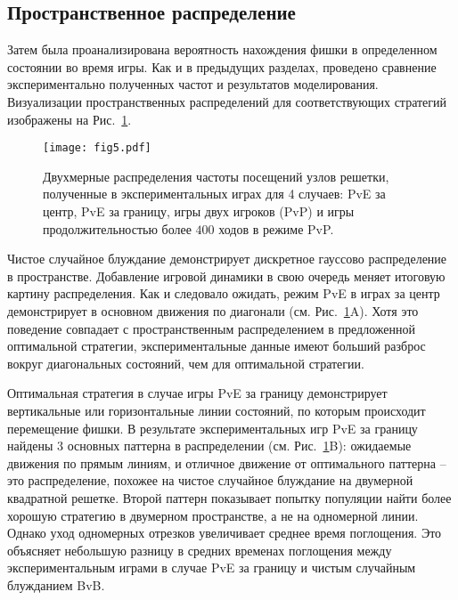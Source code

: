 \subsection{Пространственное распределение}\label{subsec:ch3/sec4/sub4}

Затем была проанализирована вероятность нахождения фишки в определенном состоянии во время игры. 
Как и в предыдущих разделах, проведено сравнение экспериментально полученных частот и результатов моделирования. 
Визуализации пространственных распределений для соответствующих стратегий изображены на Рис.~\cref{fig:distribution_states}.

\begin{figure}[t]
    \centering
    \texttt{[image: fig5.pdf]}
    \caption{
        Двухмерные распределения частоты посещений узлов решетки, полученные в экспериментальных играх для 4 случаев: 
        PvE за центр, PvE за границу, игры двух игроков (PvP) и игры продолжительностью более $400$ ходов в режиме PvP.
    }  
    \label{fig:distribution_states}
    
\end{figure}

Чистое случайное блуждание демонстрирует дискретное гауссово распределение в пространстве. 
Добавление игровой динамики в свою очередь меняет итоговую картину распределения. 
Как и следовало ожидать, режим PvE в играх за центр демонстрирует в основном движения по диагонали (см. Рис.~\cref{fig:distribution_states}A). 
Хотя это поведение совпадает с пространственным распределением в предложенной оптимальной стратегии, 
экспериментальные данные имеют больший разброс вокруг диагональных состояний, чем для оптимальной стратегии.

Оптимальная стратегия в случае игры PvE за границу демонстрирует вертикальные или горизонтальные линии состояний, 
по которым происходит перемещение фишки. В результате экспериментальных игр PvE за границу найдены 
3 основных паттерна в распределении (см. Рис.~\cref{fig:distribution_states}B): ожидаемые движения по прямым линиям, и 
отличное движение от оптимального паттерна -- это распределение, похожее на чистое случайное блуждание на двумерной квадратной решетке. 
Второй паттерн показывает попытку популяции найти более хорошую стратегию в двумерном пространстве, а не на одномерной линии. 
Однако уход одномерных отрезков увеличивает среднее время поглощения. Это объясняет небольшую разницу в средних временах 
поглощения между экспериментальным играми в случае PvE за границу и чистым случайным блужданием BvB.

